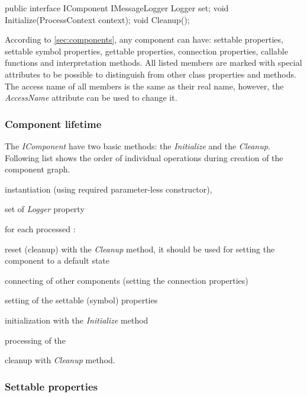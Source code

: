 \begin{Csharp}[label=code:IComponent,caption={Interface of the \emph{ProcessManager} class}]
public interface IComponent {
	IMessageLogger Logger { set; }
	void Initialize(ProcessContext context);
	void Cleanup();
}
\end{Csharp}

According to \autoref{sec:components}, any component can have: settable properties, settable symbol properties, gettable properties, connection properties, callable functions and interpretation methods.
All listed members are marked with special attributes to be possible to distinguish from other class properties and methods.
The access name of all members is the same as their real name, however, the \emph{AccessName} attribute can be used to change it.


\subsubsection{Component lifetime}
\label{sec:componentLifetime}

The \emph{IComponent} have two basic methods: the \emph{Initialize} and the \emph{Cleanup}.
Following list shows the order of individual operations during creation of the component graph.

\begin{itemize*}
	\item instantiation (using required parameter-less constructor),
	\item set of \emph{Logger} property
	\item for each processed \lsystem:
	\begin{itemize*}
		\item reset (cleanup) with the \emph{Cleanup} method, it should be used for setting the component to a default state
		\item connecting of other components (setting the connection properties)
		\item setting of the settable (symbol) properties
		\item initialization with the \emph{Initialize} method
		\item processing of the \lsystem
	\end{itemize*}
	\item cleanup with \emph{Cleanup} method.
\end{itemize*}



\subsubsection{Settable properties}

